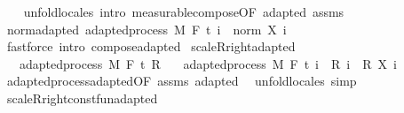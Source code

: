 \begin{isabellebody}
%
\isadelimproof
\ \ %
\endisadelimproof
%
\isatagproof
{}\isamarkupfalse%
\ {\isacharparenleft}{\kern0pt}unfold{\isacharunderscore}{\kern0pt}locales{\isacharparenright}{\kern0pt}\ {\isacharparenleft}{\kern0pt}intro\ measurable{\isacharunderscore}{\kern0pt}compose{\isacharbrackleft}{\kern0pt}OF\ adapted\ assms{\isacharbrackright}{\kern0pt}{\isacharparenright}{\kern0pt}%
\endisatagproof
{\isafoldproof}%
%
\isadelimproof
\isanewline
%
\endisadelimproof
\isanewline
{}\isamarkupfalse%
\ norm{\isacharunderscore}{\kern0pt}adapted{\isacharcolon}{\kern0pt}\ {\isachardoublequoteopen}adapted{\isacharunderscore}{\kern0pt}process\ M\ F\ t\ {\isacharparenleft}{\kern0pt}{\isasymlambda}i\ {\isasymxi}{\isachardot}{\kern0pt}\ norm\ {\isacharparenleft}{\kern0pt}X\ i\ {\isasymxi}{\isacharparenright}{\kern0pt}{\isacharparenright}{\kern0pt}{\isachardoublequoteclose}%
\isadelimproof
\ %
\endisadelimproof
%
\isatagproof
{}\isamarkupfalse%
\ {\isacharparenleft}{\kern0pt}fastforce\ intro{\isacharcolon}{\kern0pt}\ compose{\isacharunderscore}{\kern0pt}adapted{\isacharparenright}{\kern0pt}%
\endisatagproof
{\isafoldproof}%
%
\isadelimproof
%
\endisadelimproof
\isanewline
\isanewline
{}\isamarkupfalse%
\ scaleR{\isacharunderscore}{\kern0pt}right{\isacharunderscore}{\kern0pt}adapted{\isacharcolon}{\kern0pt}\isanewline
\ \ \ {\isachardoublequoteopen}adapted{\isacharunderscore}{\kern0pt}process\ M\ F\ t\ R{\isachardoublequoteclose}\isanewline
\ \ \ {\isachardoublequoteopen}adapted{\isacharunderscore}{\kern0pt}process\ M\ F\ t\ {\isacharparenleft}{\kern0pt}{\isasymlambda}i\ {\isasymxi}{\isachardot}{\kern0pt}\ {\isacharparenleft}{\kern0pt}R\ i\ {\isasymxi}{\isacharparenright}{\kern0pt}\ {\isacharasterisk}{\kern0pt}\isactrlsub R\ {\isacharparenleft}{\kern0pt}X\ i\ {\isasymxi}{\isacharparenright}{\kern0pt}{\isacharparenright}{\kern0pt}{\isachardoublequoteclose}\isanewline
%
\isadelimproof
\ \ %
\endisadelimproof
%
\isatagproof
{}\isamarkupfalse%
\ adapted{\isacharunderscore}{\kern0pt}process{\isachardot}{\kern0pt}adapted{\isacharbrackleft}{\kern0pt}OF\ assms{\isacharbrackright}{\kern0pt}\ adapted\ \isamarkupfalse%
\ {\isacharparenleft}{\kern0pt}unfold{\isacharunderscore}{\kern0pt}locales{\isacharparenright}{\kern0pt}\ simp%
\endisatagproof
{\isafoldproof}%
%
\isadelimproof
\isanewline
%
\endisadelimproof
\ \ \isanewline
{}\isamarkupfalse%
\ scaleR{\isacharunderscore}{\kern0pt}right{\isacharunderscore}{\kern0pt}const{\isacharunderscore}{\kern0pt}fun{\isacharunderscore}{\kern0pt}adapted{\isacharcolon}{\kern0pt}\isanewline

\end{isabellebody}
